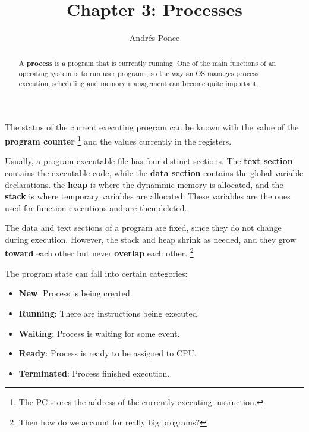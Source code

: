 \documentclass{tufte-handout}
\title{Chapter 3: Processes}
\author{Andr\'es Ponce}
\begin{document}
\maketitle

\begin{abstract}
A \textbf{process} is a program that is currently running.
One of the main functions of an operating system is to run user programs,
so the way an OS manages process execution, scheduling and memory management
can become quite important.
\end{abstract}

The status of the current executing program can be known with the value of the 
\textbf{program counter}
\footnote{The PC stores the address of the currently executing instruction.}
and the values currently in the registers.

Usually, a program executable file has four distinct sections. The \textbf{text section}
contains the executable code, while the \textbf{data section} contains the global 
variable declarations. the \textbf{heap} is where the dynammic memory is allocated, and 
the \textbf{stack} is where temporary variables are allocated. These variables are the ones
used for function executions and are then deleted.

The data and text sections of a program are fixed, since they do not change during execution.
However, the stack and heap shrink as needed, and they grow \textbf{toward} each other but
never \textbf{overlap} each other. \footnote{Then how do we account for really big programs?}

The program state can fall into certain categories:
\begin{itemize}
	\item \textbf{New}: Process is being created.
	\item \textbf{Running}: There are instructions being executed.
	\item \textbf{Waiting}: Process is waiting for some event.
	\item \textbf{Ready}: Process is ready to be assigned to CPU.
	\item \textbf{Terminated}: Process finished execution.
\end{itemize}
\end{document}
